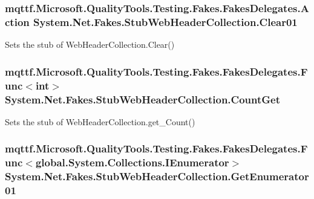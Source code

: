 \hypertarget{class_system_1_1_net_1_1_fakes_1_1_stub_web_header_collection_a852d4e4d0796d220068ceed1f832b283}{
\subsubsection[{Clear01}]{\setlength{\rightskip}{0pt plus 5cm}mqttf.\-Microsoft.\-Quality\-Tools.\-Testing.\-Fakes.\-Fakes\-Delegates.\-Action System.\-Net.\-Fakes.\-Stub\-Web\-Header\-Collection.\-Clear01}}\label{class_system_1_1_net_1_1_fakes_1_1_stub_web_header_collection_a852d4e4d0796d220068ceed1f832b283}


Sets the stub of Web\-Header\-Collection.\-Clear()

\hypertarget{class_system_1_1_net_1_1_fakes_1_1_stub_web_header_collection_aa20d2599d688de64a71f61693fa17d98}{
\subsubsection[{Count\-Get}]{\setlength{\rightskip}{0pt plus 5cm}mqttf.\-Microsoft.\-Quality\-Tools.\-Testing.\-Fakes.\-Fakes\-Delegates.\-Func$<$int$>$ System.\-Net.\-Fakes.\-Stub\-Web\-Header\-Collection.\-Count\-Get}}\label{class_system_1_1_net_1_1_fakes_1_1_stub_web_header_collection_aa20d2599d688de64a71f61693fa17d98}


Sets the stub of Web\-Header\-Collection.\-get\-\_\-\-Count()

\hypertarget{class_system_1_1_net_1_1_fakes_1_1_stub_web_header_collection_ad513317edd00be79753681337b5e5c93}{
\subsubsection[{Get\-Enumerator01}]{\setlength{\rightskip}{0pt plus 5cm}mqttf.\-Microsoft.\-Quality\-Tools.\-Testing.\-Fakes.\-Fakes\-Delegates.\-Func$<$global.\-System.\-Collections.\-I\-Enumerator$>$ System.\-Net.\-Fakes.\-Stub\-Web\-Header\-Collection.\-Get\-Enumerator01}}\label{class_system_1_1_net_1_1_fakes_1_1_stub_web_header_collection_ad513317edd00be79753681337b5e5c93}


